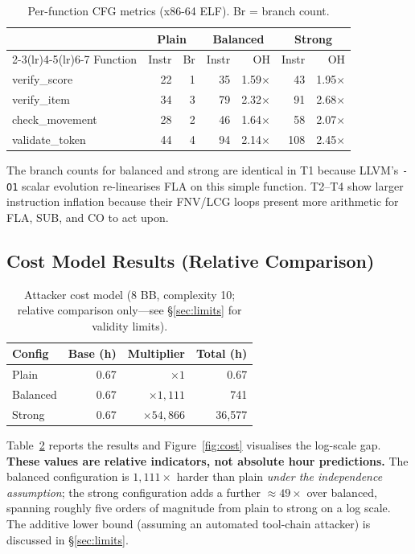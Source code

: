 \documentclass[conference]{IEEEtran}
\begin{document}
\begin{table}[t]
\centering
\caption{Per-function CFG metrics (x86-64 ELF). Br = branch count.}
\label{tab:perfunc}
\footnotesize
\setlength{\tabcolsep}{3.5pt}
\begin{tabular}{lrrrrrr}
\toprule
 & \multicolumn{2}{c}{Plain} & \multicolumn{2}{c}{Balanced} & \multicolumn{2}{c}{Strong} \\
\cmidrule(lr){2-3}\cmidrule(lr){4-5}\cmidrule(lr){6-7}
Function & Instr & Br & Instr & OH & Instr & OH \\
\midrule
verify\_score   & 22 & 1 & 35  & 1.59$\times$ & 43  & 1.95$\times$ \\
verify\_item    & 34 & 3 & 79  & 2.32$\times$ & 91  & 2.68$\times$ \\
check\_movement & 28 & 2 & 46  & 1.64$\times$ & 58  & 2.07$\times$ \\
validate\_token & 44 & 4 & 94  & 2.14$\times$ & 108 & 2.45$\times$ \\
\bottomrule
\end{tabular}
\end{table}

The branch counts for balanced and strong are identical in T1 because
LLVM's \texttt{-O1} scalar evolution re-linearises FLA on this simple
function.
T2--T4 show larger instruction inflation because their FNV/LCG loops
present more arithmetic for FLA, SUB, and CO to act upon.

\subsection{Cost Model Results (Relative Comparison)}

\begin{table}[t]
\centering
\caption{Attacker cost model (8 BB, complexity 10; relative comparison
  only---see \S\ref{sec:limits} for validity limits).}
\label{tab:cost}
\footnotesize
\begin{tabular}{lrrr}
\toprule
Config   & Base (h) & Multiplier & Total (h) \\
\midrule
Plain    & 0.67  & $\times 1$          &  0.67  \\
Balanced & 0.67  & $\times 1{,}111$    &  741   \\
Strong   & 0.67  & $\times 54{,}866$   & 36{,}577 \\
\bottomrule
\end{tabular}
\end{table}

Table~\ref{tab:cost} reports the results and Figure~\ref{fig:cost}
visualises the log-scale gap.
\textbf{These values are relative indicators, not absolute hour predictions.}
The balanced configuration is $1{,}111\times$ harder than plain
\emph{under the independence assumption}; the strong configuration
adds a further $\approx49\times$ over balanced, spanning roughly five
orders of magnitude from plain to strong on a log scale.
The additive lower bound (assuming an automated tool-chain attacker) is
discussed in \S\ref{sec:limits}.
\end{document}
